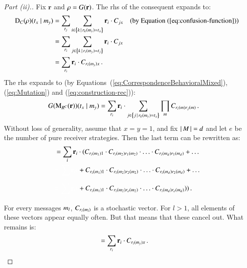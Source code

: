 \documentclass[fleqn,reqno,10pt]{article}
\renewcommand{\Rmixed}{\ensuremath{\mathrm{\mathbf{r}}}}
\newcommand{\Diff}{\ensuremath{\mathrm{D}}} %
\newcommand{\Mutate}{\ensuremath{\mathrm{M}}} %
\begin{document}
\begin{proof}[Part (ii).]
  Fix $\Rmixed$ and $\Rstrat = G(\Rmixed)$. The rhs of the consequent
  expands to:
  \begin{align*}
    \Diff_C(\Rstrat)(\state_x \probbar \messg_y) & = \sum_{\state_j}
    \sum_{i \in \set{k \setbar \Rpure_k(\messg_y) = \state_x}}
    \Rmixed_i \cdot C_{jx} && \text{(by Equation~(\ref{eq:confusion-function}))} \\
    & = \sum_{\Rpure_i} \sum_{j \in \set{k \setbar \Rpure_i(\messg_y) = \state_j}}
    \Rmixed_i \cdot C_{jx} \\
    & = \sum_{\Rpure_i} \Rmixed_i \cdot C_{\Rpure_i(\messg_y)x} \,.
  \end{align*}
  The rhs expands to (by Equations~(\ref{eq:CorrespondenceBehavioralMixed}),
  (\ref{eq:Mutation}) and (\ref{eq:construction-rec})):
  \begin{align*}
    G(\Mutate_{R^C}(\Rmixed))(\state_x \probbar \messg_y) & = \sum_{\Rpure_i}
    \Rmixed_i \cdot \sum_{j \in \set{j \setbar \Rpure_k(\messg_y) =
        \state_x}} 
    \prod_{\messg} C_{\Rpure_i(\messg)\Rpure_j(\messg)} \,.
  \end{align*}
  Without loss of generality, assume that $x=y=1$, and fix
  $\left \lvert \, M \, \right\rvert=d$ and let $e$ be the number of pure receiver
  strategies. Then the last term can be rewritten as:
  \begin{align*}
    & = \sum_{i}
    \Rmixed_i \cdot ( C_{\Rpure_i(\messg_1)1} \cdot
      C_{\Rpure_i(\messg_2)\Rpure_1(\messg_2)} \cdot \ldots \cdot
      C_{\Rpure_i(\messg_d)\Rpure_1(\messg_d)} + \ldots  \\
      & \textcolor{white}{ = \sum_{i}
    \Rmixed_i  (}  +  C_{\Rpure_i(\messg_1)1} \cdot
      C_{\Rpure_i(\messg_2)\Rpure_2(\messg_2)} \cdot \ldots \cdot
      C_{\Rpure_i(\messg_d)\Rpure_2(\messg_d)} + \ldots  \\
      & \textcolor{white}{ = \sum_{i}
    \Rmixed_i  (}  + C_{\Rpure_i(\messg_1)1} \cdot
      C_{\Rpure_i(\messg_2)\Rpure_e(\messg_2)} \cdot \ldots \cdot
      C_{\Rpure_i(\messg_d)\Rpure_e(\messg_d)}) ) \,.
  \end{align*}
  For every messages $m_l$, $C_{r_i(m_l)}$ is a stochastic
  vector. For $l>1$, all elements of these vectors appear equally
  often. But that means that these cancel out. What remains is:
  \begin{align*}
    & = \sum_{\Rpure_i} \Rmixed_i \cdot C_{\Rpure_i(\messg_y)x} \,.
  \end{align*}
\end{proof}
\end{document}
